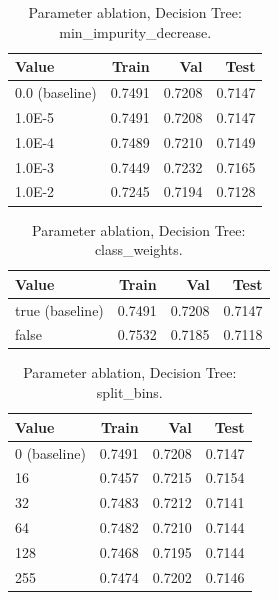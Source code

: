 \begin{table}[ht]
\centering
\small
\caption{Parameter ablation, Decision Tree: min\_impurity\_decrease.}
\label{tab:ablation-tree-min-impurity-decrease}
\begin{tabular}{lrrr}
\toprule
Value & Train & Val & Test \\
\midrule
0.0 (baseline) & 0.7491 & 0.7208 & 0.7147 \\
1.0E-5 & 0.7491 & 0.7208 & 0.7147 \\
1.0E-4 & 0.7489 & 0.7210 & 0.7149 \\
1.0E-3 & 0.7449 & 0.7232 & 0.7165 \\
1.0E-2 & 0.7245 & 0.7194 & 0.7128 \\
\bottomrule
\end{tabular}
\end{table}

\begin{table}[ht]
\centering
\small
\caption{Parameter ablation, Decision Tree: class\_weights.}
\label{tab:ablation-tree-class-weights}
\begin{tabular}{lrrr}
\toprule
Value & Train & Val & Test \\
\midrule
true (baseline) & 0.7491 & 0.7208 & 0.7147 \\
false & 0.7532 & 0.7185 & 0.7118 \\
\bottomrule
\end{tabular}
\end{table}

\begin{table}[ht]
\centering
\small
\caption{Parameter ablation, Decision Tree: split\_bins.}
\label{tab:ablation-tree-split-bins}
\begin{tabular}{lrrr}
\toprule
Value & Train & Val & Test \\
\midrule
0 (baseline) & 0.7491 & 0.7208 & 0.7147 \\
16 & 0.7457 & 0.7215 & 0.7154 \\
32 & 0.7483 & 0.7212 & 0.7141 \\
64 & 0.7482 & 0.7210 & 0.7144 \\
128 & 0.7468 & 0.7195 & 0.7144 \\
255 & 0.7474 & 0.7202 & 0.7146 \\
\bottomrule
\end{tabular}
\end{table}


